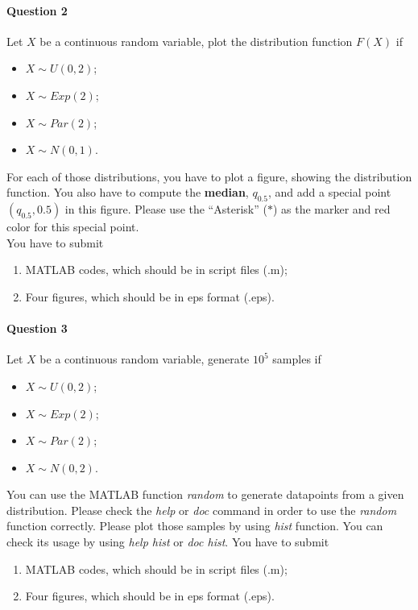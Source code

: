 \documentclass[11pt]{article} %
\begin{document}
\paragraph*{Question 2}
Let $X$ be a continuous random variable, plot the distribution function $F(X)$ if 
\begin{itemize}
\item $X \sim U(0, 2)$; 
\item $X \sim Exp(2)$;
\item $X \sim Par(2)$;
\item $X \sim N(0, 1)$. 
\end{itemize}
For each of those distributions, you have to plot a figure, showing the distribution function. You also have to compute the {\bf median}, $q_{0.5}$, and add a special point $(q_{0.5}, 0.5)$ in this figure. Please use the ``Asterisk'' ($\ast$) as the marker and {\color{red}red} color for this special point. \\
You have to submit 
\begin{enumerate}
\item MATLAB codes, which should be in script files (.m);
\item Four figures, which should be in eps format (.eps).
\end{enumerate}

\paragraph*{Question 3}

Let $X$ be a continuous random variable, generate $10^5$ samples if 
\begin{itemize}
\item $X \sim U(0, 2)$;
\item $X \sim Exp(2)$;
\item $X \sim Par(2)$;
\item $X \sim N(0, 2)$. 
\end{itemize}
You can use the MATLAB function {\it random} to generate datapoints from a given distribution. Please check the {\it help} or {\it doc} command in order to use the {\it random} function correctly. Please plot those samples by using {\it hist} function. You can check its usage by using {\it help hist} or {\it doc hist}.  
You have to submit 
\begin{enumerate}
\item MATLAB codes, which should be in script files (.m);
\item Four figures, which should be in eps format (.eps).
\end{enumerate}
\end{document}

